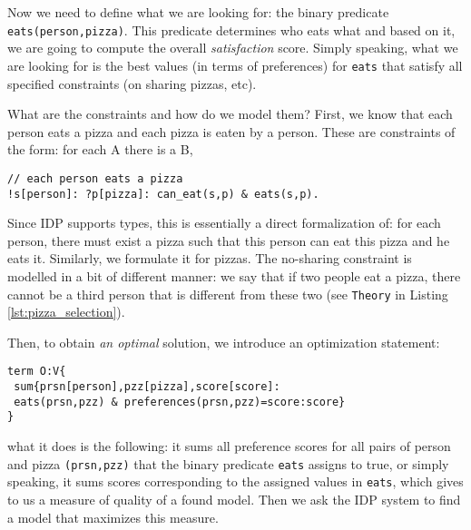 Now we need to define what we are looking for: the binary predicate \texttt{eats(person,pizza)}. This predicate determines who eats what and based on it, we are going to compute the overall \textit{satisfaction} score. Simply speaking, what we are looking for is the best values (in terms of preferences) for \texttt{eats} that satisfy all specified constraints (on sharing pizzas, etc).

What are the constraints and how do we model them? First, we know that each person eats a pizza and each pizza is eaten by a person. These are constraints of the form: for each A there is a B,
\begin{verbatim}
// each person eats a pizza 
!s[person]: ?p[pizza]: can_eat(s,p) & eats(s,p). 
\end{verbatim}
Since IDP supports types, this is essentially a direct formalization of: for each person, there must exist a pizza such that this person can eat this pizza and he eats it. Similarly, we formulate it for pizzas. The no-sharing constraint is modelled in a bit of different manner: we say that if two people eat a pizza, there cannot be a third person that is different from these two (see \texttt{Theory} in Listing \ref{lst:pizza_selection}).

Then, to obtain \textit{an optimal} solution, we introduce an optimization statement:
\begin{verbatim}
term O:V{
 sum{prsn[person],pzz[pizza],score[score]: 
 eats(prsn,pzz) & preferences(prsn,pzz)=score:score}
}
\end{verbatim}
what it does is the following: it sums all preference scores for all pairs of person and pizza \texttt{(prsn,pzz)} that the binary predicate \texttt{eats} assigns to true, or simply speaking, it sums scores corresponding to the assigned values in \texttt{eats}, which gives to us a measure of quality of a found model. Then we ask the IDP system to find a model that maximizes this measure.


